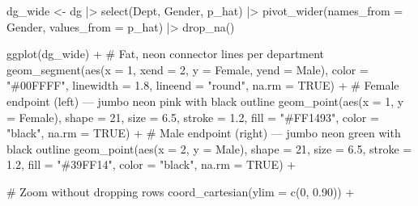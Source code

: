 \documentclass[
  letterpaper,
  DIV=11,
  numbers=noendperiod]{scrreprt}
\newenvironment{Shaded}{\begin{snugshade}}{\end{snugshade}}
\newcommand{\AttributeTok}[1]{\textcolor[rgb]{0.40,0.45,0.13}{#1}}
\newcommand{\CommentTok}[1]{\textcolor[rgb]{0.37,0.37,0.37}{#1}}
\newcommand{\ConstantTok}[1]{\textcolor[rgb]{0.56,0.35,0.01}{#1}}
\newcommand{\DecValTok}[1]{\textcolor[rgb]{0.68,0.00,0.00}{#1}}
\newcommand{\FloatTok}[1]{\textcolor[rgb]{0.68,0.00,0.00}{#1}}
\newcommand{\FunctionTok}[1]{\textcolor[rgb]{0.28,0.35,0.67}{#1}}
\newcommand{\NormalTok}[1]{\textcolor[rgb]{0.00,0.23,0.31}{#1}}
\newcommand{\OtherTok}[1]{\textcolor[rgb]{0.00,0.23,0.31}{#1}}
\newcommand{\SpecialCharTok}[1]{\textcolor[rgb]{0.37,0.37,0.37}{#1}}
\newcommand{\StringTok}[1]{\textcolor[rgb]{0.13,0.47,0.30}{#1}}
\begin{document}
\begin{Shaded}
\begin{Highlighting}[]
\NormalTok{ dg\_wide }\OtherTok{\textless{}{-}}\NormalTok{ dg }\SpecialCharTok{|\textgreater{}}
  \FunctionTok{select}\NormalTok{(Dept, Gender, p\_hat) }\SpecialCharTok{|\textgreater{}}
  \FunctionTok{pivot\_wider}\NormalTok{(}\AttributeTok{names\_from =}\NormalTok{ Gender, }\AttributeTok{values\_from =}\NormalTok{ p\_hat) }\SpecialCharTok{|\textgreater{}}
  \FunctionTok{drop\_na}\NormalTok{()}


\FunctionTok{ggplot}\NormalTok{(dg\_wide) }\SpecialCharTok{+}
  \CommentTok{\# Fat, neon connector lines per department}
  \FunctionTok{geom\_segment}\NormalTok{(}\FunctionTok{aes}\NormalTok{(}\AttributeTok{x =} \DecValTok{1}\NormalTok{, }\AttributeTok{xend =} \DecValTok{2}\NormalTok{, }\AttributeTok{y =}\NormalTok{ Female, }\AttributeTok{yend =}\NormalTok{ Male),}
               \AttributeTok{color =} \StringTok{"\#00FFFF"}\NormalTok{, }\AttributeTok{linewidth =} \FloatTok{1.8}\NormalTok{, }\AttributeTok{lineend =} \StringTok{"round"}\NormalTok{, }\AttributeTok{na.rm =} \ConstantTok{TRUE}\NormalTok{) }\SpecialCharTok{+}
  \CommentTok{\# Female endpoint (left) — jumbo neon pink with black outline}
  \FunctionTok{geom\_point}\NormalTok{(}\FunctionTok{aes}\NormalTok{(}\AttributeTok{x =} \DecValTok{1}\NormalTok{, }\AttributeTok{y =}\NormalTok{ Female),}
             \AttributeTok{shape =} \DecValTok{21}\NormalTok{, }\AttributeTok{size =} \FloatTok{6.5}\NormalTok{, }\AttributeTok{stroke =} \FloatTok{1.2}\NormalTok{,}
             \AttributeTok{fill =} \StringTok{"\#FF1493"}\NormalTok{, }\AttributeTok{color =} \StringTok{"black"}\NormalTok{, }\AttributeTok{na.rm =} \ConstantTok{TRUE}\NormalTok{) }\SpecialCharTok{+}
  \CommentTok{\# Male endpoint (right) — jumbo neon green with black outline}
  \FunctionTok{geom\_point}\NormalTok{(}\FunctionTok{aes}\NormalTok{(}\AttributeTok{x =} \DecValTok{2}\NormalTok{, }\AttributeTok{y =}\NormalTok{ Male),}
             \AttributeTok{shape =} \DecValTok{21}\NormalTok{, }\AttributeTok{size =} \FloatTok{6.5}\NormalTok{, }\AttributeTok{stroke =} \FloatTok{1.2}\NormalTok{,}
             \AttributeTok{fill =} \StringTok{"\#39FF14"}\NormalTok{, }\AttributeTok{color =} \StringTok{"black"}\NormalTok{, }\AttributeTok{na.rm =} \ConstantTok{TRUE}\NormalTok{) }\SpecialCharTok{+}

  \CommentTok{\# Zoom without dropping rows}
  \FunctionTok{coord\_cartesian}\NormalTok{(}\AttributeTok{ylim =} \FunctionTok{c}\NormalTok{(}\DecValTok{0}\NormalTok{, }\FloatTok{0.90}\NormalTok{)) }\SpecialCharTok{+}


\end{Highlighting}
\end{Shaded}
\end{document}
